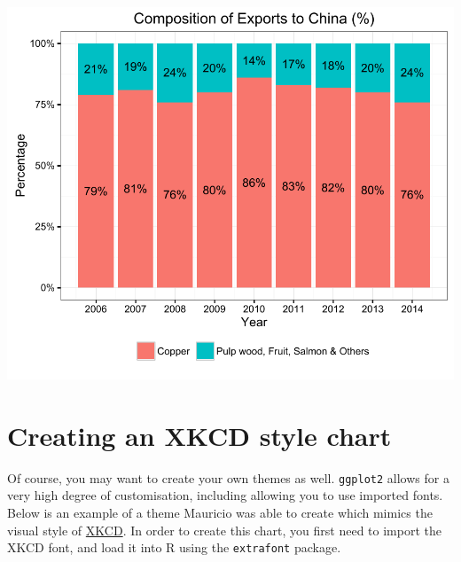 \begin{center}\includegraphics[width=0.6\linewidth]{4_Stacked_Bar_pdf/stacked_9-1} \end{center}

\section{Creating an XKCD style
chart}\label{creating-an-xkcd-style-chart}

Of course, you may want to create your own themes as well.
\texttt{ggplot2} allows for a very high degree of customisation,
including allowing you to use imported fonts. Below is an example of a
theme Mauricio was able to create which mimics the visual style of
\href{http://xkcd.com/}{XKCD}. In order to create this chart, you first
need to import the XKCD font, and load it into R using the
\texttt{extrafont} package.

